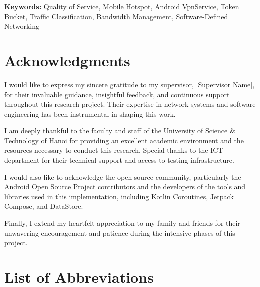 \textbf{Keywords:} Quality of Service, Mobile Hotspot, Android VpnService, Token Bucket, Traffic Classification, Bandwidth Management, Software-Defined Networking

\cleardoublepage

\chapter*{Acknowledgments}

I would like to express my sincere gratitude to my supervisor, [Supervisor Name], for their invaluable guidance, insightful feedback, and continuous support throughout this research project. Their expertise in network systems and software engineering has been instrumental in shaping this work.

I am deeply thankful to the faculty and staff of the University of Science \& Technology of Hanoi for providing an excellent academic environment and the resources necessary to conduct this research. Special thanks to the ICT department for their technical support and access to testing infrastructure.

I would also like to acknowledge the open-source community, particularly the Android Open Source Project contributors and the developers of the tools and libraries used in this implementation, including Kotlin Coroutines, Jetpack Compose, and DataStore.

Finally, I extend my heartfelt appreciation to my family and friends for their unwavering encouragement and patience during the intensive phases of this project.

\cleardoublepage

\tableofcontents
\cleardoublepage

\listoffigures
{}
\cleardoublepage

\listoftables
{}
\cleardoublepage

\listofalgorithms
{}
\cleardoublepage

\chapter*{List of Abbreviations}

